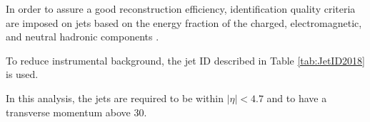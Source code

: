 \label{sec:jet_ID}
In order to assure a good reconstruction efficiency, identification quality criteria are imposed on jets based on
the energy fraction of the charged, electromagnetic, and neutral hadronic components \cite{CMS-PAS-JME-16-003}.

To reduce instrumental background, the jet ID described in Table \ref{tab:JetID2018} is used.

\begin{table}
  \caption{Jet identification criteria used in \RunII with thresholds used for 2018 data.}
  \label{tab:JetID2018}
\end{table}

In this analysis, the jets are required to be within $|\eta| < 4.7$ and to have a transverse momentum above 30\GeV.

